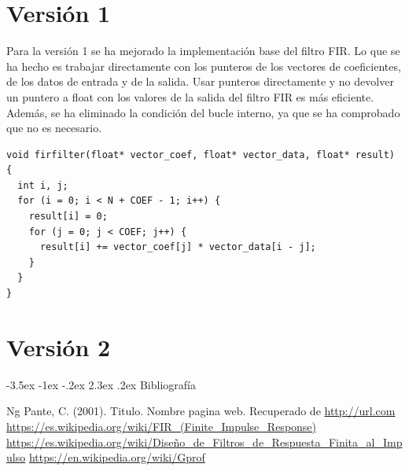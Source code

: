 \documentclass[11pt]{report}
\makeatletter
\renewcommand\chapter{\@startsection{chapter}{0}{\z@}%
    {-3.5ex \@plus -1ex \@minus -.2ex}%
    {2.3ex \@plus.2ex}%
    {\normalfont\Large\bfseries}}
\makeatother
\begin{document}
\section{Versión 1}
Para la versión 1 se ha mejorado la implementación base del filtro FIR. Lo que se ha hecho es trabajar directamente con los punteros de los vectores de coeficientes,
de los datos de entrada y de la salida. Usar punteros directamente y no devolver un puntero a float con los valores de la salida del filtro FIR es más eficiente. Además, 
se ha eliminado la condición del bucle interno, ya que se ha comprobado que no es necesario.

\begin{lstlisting}
void firfilter(float* vector_coef, float* vector_data, float* result) {
  int i, j;
  for (i = 0; i < N + COEF - 1; i++) {
    result[i] = 0;
    for (j = 0; j < COEF; j++) {
      result[i] += vector_coef[j] * vector_data[i - j];
    }
  }
}
\end{lstlisting}

\section{Versión 2}


\newpage

\chapter{Bibliografía} %
\begin{thebibliography}{99}
       Ng Pante, C. (2001). Titulo. Nombre pagina web. Recuperado de \url{http://url.com}
       \url{https://es.wikipedia.org/wiki/FIR_(Finite_Impulse_Response)}
       \url{https://es.wikipedia.org/wiki/Diseño_de_Filtros_de_Respuesta_Finita_al_Impulso}
       \url{https://en.wikipedia.org/wiki/Gprof}
\end{thebibliography}
\end{document}

